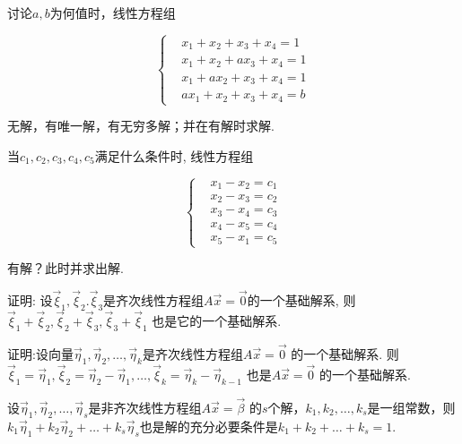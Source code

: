 \begin{ex}\label{5.20}
讨论$a,b$为何值时，线性方程组

\begin{displaymath}\left\{\begin{aligned}&
x_1+x_2+x_3+x_4=1\\&x_1+x_2+ax_3+x_4=1\\&x_1+ax_2+x_3+x_4=1\\&ax_1+x_2+x_3+x_4=b
\end{aligned}\right.\end{displaymath}

无解，有唯一解，有无穷多解；并在有解时求解.
\end{ex}

\begin{ex}\label{5.21}
当$c_1,c_2,c_3,c_4,c_5$满足什么条件时, 线性方程组

\begin{displaymath}\left\{\begin{aligned}&
x_1-x_2=c_1\\&x_2-x_3=c_2\\&x_3-x_4=c_3\\&x_4-x_5=c_4\\&x_5-x_1=c_5
\end{aligned}\right.\end{displaymath}

有解？此时并求出解.
\end{ex}

\begin{ex}\label{5.22}
证明: 设$\vec{\xi}_1,\vec{\xi}_2.\vec{\xi}_3$是齐次线性方程组$A\vec{x}=\vec{0}$的一个基础解系, 则$\vec{\xi}_1+\vec{\xi}_2,\vec{\xi}_2+\vec{\xi}_3,\vec{\xi}_3+\vec{\xi}_1$ 也是它的一个基础解系.
\end{ex}

\begin{ex}\label{5.23}
证明:设向量$\vec{\eta}_1,\vec{\eta}_2,\dots ,\vec{\eta}_k$是齐次线性方程组$A\vec{x}=\vec{0}$ 的一个基础解系. 则 $\vec{\xi}_1=\vec{\eta}_1,\vec{\xi}_2=\vec{\eta}_2-\vec{\eta}_1,\dots,\vec{\xi}_k=\vec{\eta}_k-\vec{\eta}_{k-1}$ 也是$A\vec{x}=\vec{0}$ 的一个基础解系.
\end{ex}

\begin{ex}\label{5.24}
设$\vec{\eta}_1,\vec{\eta}_2,\dots,\vec{\eta}_s$是非齐次线性方程组$A\vec{x}=\vec{\beta}$ 的$s$个解，$k_1,k_2,\dots,k_s$是一组常数，则$k_1 \vec{\eta}_1+k_2 \vec{\eta}_2+\dots+k_s \vec{\eta}_s$也是解的充分必要条件是$k_1+k_2+\dots +k_s=1$.
\end{ex}

